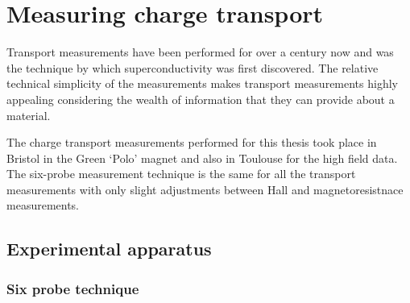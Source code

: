 
\section{Measuring charge transport}

Transport measurements have been performed for over a century now and was the technique by which superconductivity was first discovered. The relative technical simplicity of the measurements makes transport measurements highly appealing considering the wealth of information that they can provide about a material.

The charge transport measurements performed for this thesis took place in Bristol in the Green `Polo' magnet and also in Toulouse for the high field data. The six-probe measurement technique is the same for all the transport measurements with only slight adjustments between Hall and magnetoresistnace measurements.

\subsection{Experimental apparatus}

\subsubsection{Six probe technique}

